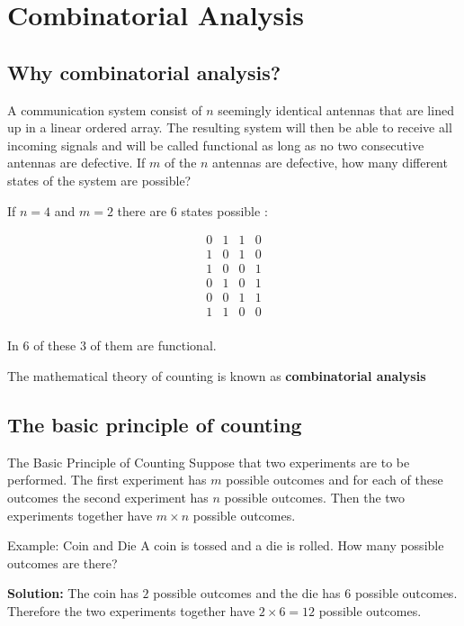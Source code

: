 \chapter{Combinatorial Analysis}

\section{Why combinatorial analysis?}

A communication system consist of \(n\) seemingly identical antennas that are lined up in a linear ordered array. The resulting system will then be able to receive all incoming signals and will be called functional as long as no two consecutive antennas are defective. If \(m\) of the \(n\) antennas are defective, how many different states of the system are possible?

If \(n =4\) and \(m=2\) there are \(6\) states possible : 

\[ 
\begin{matrix}
    0 & 1 & 1 & 0 \\
    1 & 0 & 1 & 0 \\
    1 & 0 & 0 & 1 \\
    0 & 1 & 0 & 1 \\
    0 & 0 & 1 & 1 \\
    1 & 1 & 0 & 0 \\
\end{matrix}
\]

In \(6\) of these \(3\) of them are functional. 

\begin{definition}
    The mathematical theory of counting is known as \textbf{combinatorial analysis}  
\end{definition}

\section{The basic principle of counting}

\begin{definitionboxbreak}{The Basic Principle of Counting}
    Suppose that two experiments are to be performed. The first experiment has \(m\) possible outcomes and for each of these outcomes the second experiment has \(n\) possible outcomes. Then the two experiments together have \(m \times n\) possible outcomes.
\end{definitionboxbreak}
\begin{exampleboxbreak}{Example: Coin and Die}
    A coin is tossed and a die is rolled. How many possible outcomes are there?

    \textbf{Solution:} The coin has \(2\) possible outcomes and the die has \(6\) possible outcomes. Therefore the two experiments together have \(2 \times 6 = 12\) possible outcomes.
\end{exampleboxbreak}


